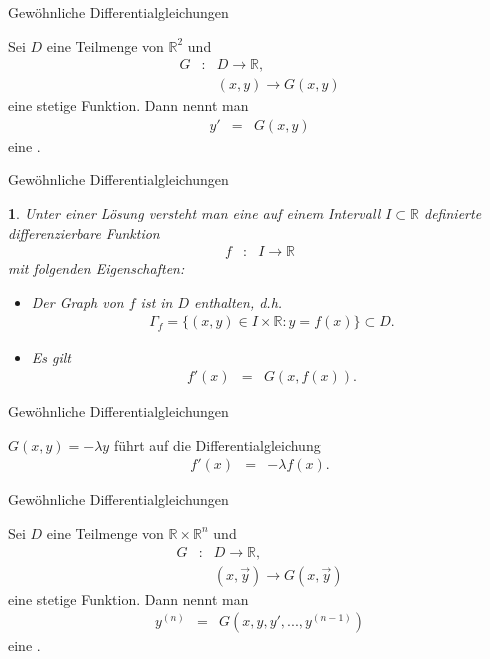\documentclass[german]{beamer}
\newcommand{\bq}{\begin{eqnarray*}}
\newcommand{\eq}{\end{eqnarray*}}
\newcommand{\superalert}[1]{{\color{MyYellowOrange}{#1}}}
\newtheorem*{myemptytheorem}{}
\begin{document}
\begin{frame}{Gew\"ohnliche Differentialgleichungen}

\begin{definition}
Sei $D$ eine Teilmenge von ${\mathbb R}^2$ und
\bq
 G & : & D \rightarrow {\mathbb R},
 \nonumber \\
 & & (x,y) \rightarrow G(x,y)
\eq
eine stetige Funktion.
Dann nennt man
\bq
 y' & = & G(x,y)
\eq
eine \superalert{Differentialgleichung erster Ordnung}. 
\end{definition}

\end{frame}

\begin{frame}{Gew\"ohnliche Differentialgleichungen}

\begin{myemptytheorem}
Unter einer L\"osung versteht man
eine auf einem Intervall $I \subset \mathbb R$ definierte differenzierbare Funktion
\bq
 f & : & I \rightarrow {\mathbb R}
\eq
mit folgenden Eigenschaften:
\begin{itemize}
\item Der Graph von $f$ ist in $D$ enthalten, d.h.
\bq
 \Gamma_f = \{(x,y) \in I \times {\mathbb R} : y=f(x) \} \subset D.
\eq
\item Es gilt
\bq
 f'(x) & = & G(x,f(x)).
\eq
\end{itemize}
\end{myemptytheorem}

\end{frame}

\begin{frame}{Gew\"ohnliche Differentialgleichungen}

\begin{example}
$G(x,y)=-\lambda y$ f\"uhrt auf die Differentialgleichung
\bq
 f'(x) & = & -\lambda f(x).
\eq
\end{example}

\end{frame}

\begin{frame}{Gew\"ohnliche Differentialgleichungen}

\begin{definition}
Sei $D$ eine Teilmenge von ${\mathbb R} \times {\mathbb R}^n$ und 
\bq
 G & : & D \rightarrow {\mathbb R},
 \nonumber \\
 & & \left(x,\vec{y}\right) \rightarrow G\left(x,\vec{y}\right)
\eq
eine stetige Funktion.
Dann nennt man
\bq
 y^{(n)} & = & G\left(x,y,y',...,y^{(n-1)}\right)
\eq
eine \superalert{Differentialgleichungen $n$-ter Ordnung}.
\end{definition}

\end{frame}
\end{document}
